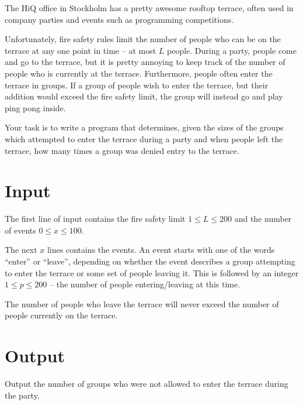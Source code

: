 The HiQ office in Stockholm has a pretty awesome rooftop terrace, often used in company parties and events such as programming competitions.

Unfortunately, fire safety rules limit the number of people who can be on the terrace at any one point in time -- at most $L$ people.
During a party, people come and go to the terrace, but it is pretty annoying to keep track of the number of people who is currently at the terrace. Furthermore, people often enter the terrace in groups. If a group of people wish to enter the terrace, but their addition would exceed the fire safety limit, the group will instead go and play ping pong inside. 

Your task is to write a program that determines, given the sizes of the groups which attempted to enter the terrace during a party and when people left the terrace, how many times a group was denied entry to the terrace.

\section*{Input}
The first line of input contains the fire safety limit $1 \le L \le 200$ and the number of events $0 \le x \le 100$.

The next $x$ lines contains the events.
An event starts with one of the words ``enter'' or ``leave'', depending on whether the event describes a group attempting to enter the terrace or some set of people leaving it.
This is followed by an integer $1 \le p \le 200$ -- the number of people entering/leaving at this time.

The number of people who leave the terrace will never exceed the number of people currently on the terrace.

\section*{Output}
Output the number of groups who were not allowed to enter the terrace during the party.
